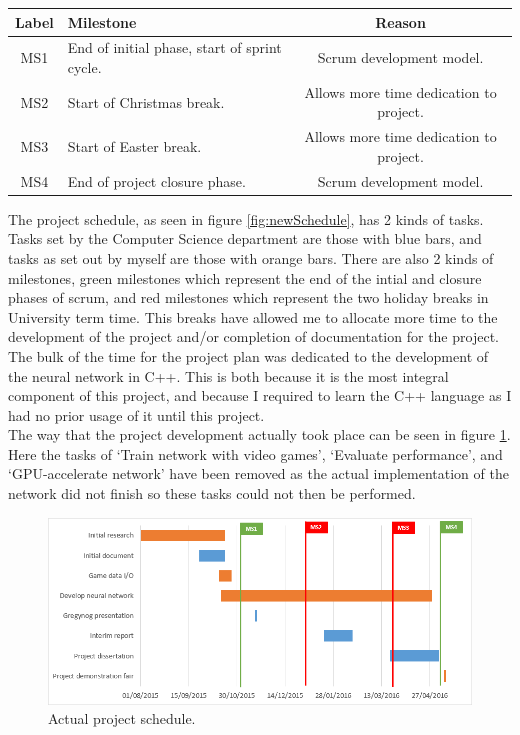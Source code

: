\documentclass[10pt]{article}
\begin{document}
		\begin{center}
			\begin{tabular}{ c | p{3.5cm} | c }
				\textbf{Label} & \textbf{Milestone} & \textbf{Reason} \\ \hline
				MS1 & End of initial phase, start of sprint cycle. & Scrum development model.\\ \hline
				MS2 & Start of Christmas break. & Allows more time dedication to project.\\ \hline
				MS3 & Start of Easter break. & Allows more time dedication to project.\\ \hline
				MS4 & End of project closure phase. & Scrum development model.					 
			\end{tabular}
		\end{center}		
		The project schedule, as seen in figure \ref{fig:newSchedule}, has 2 kinds of tasks. Tasks set by the Computer Science department are those with blue bars, and tasks as set out by myself are those with orange bars. There are also 2 kinds of milestones, green milestones which represent the end of the intial and closure phases of scrum, and red milestones which represent the two holiday breaks in University term time. This breaks have allowed me to allocate more time to the development of the project and/or completion of documentation for the project. The bulk of the time for the project plan was dedicated to the development of the neural network in C++. This is both because it is the most integral component of this project, and because I required to learn the C++ language as I had no prior usage of it until this project.\\
		
		The way that the project development actually took place can be seen in figure \ref{fig:actSchedule}. Here the tasks of `Train network with video games', `Evaluate performance', and `GPU-accelerate network' have been removed as the actual implementation of the network did not finish so these tasks could not then be performed.\\
		
		\begin{figure}[h]				
			\includegraphics[scale=0.6]{img/finalSchedule}
			\centering
			\caption{Actual project schedule.}
			\label{fig:actSchedule}
		\end{figure}
		
\end{document}
